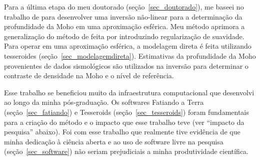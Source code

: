 \documentclass[10pt,a4paper,oneside]{book}
\begin{document}
Para a última etapa do meu doutorado (seção~\ref{sec_doutorado}), me baseei no
trabalho de \citet{Silva2014} para desenvolver uma inversão não-linear para
a determinação da profundidade da Moho em uma aproximação esférica.
Meu método aprimora a generalização do método de \citet{Bott1960} feita por
\citet{Silva2014} introduzindo regularização de suavidade.
Para operar em uma aproximação esférica, a modelagem direta é feita utilizando
tesseroides (seção~\ref{sec_modelagemdireta}).
Estimativas da profundidade da Moho provenientes de dados sismológicos são
utilizados na inversão para determinar o contraste de densidade na Moho e o
nível de referência.

Esse trabalho se beneficiou muito da infraestrutura computacional que
desenvolvi ao longo da minha pós-graduação.
Os softwares Fatiando a Terra (seção~\ref{sec_fatiando}) e Tesseroids
(seção~\ref{sec_tesseroids}) foram fundamentais para a criação do método e
o impacto que esse trabalho teve (ver ``impacto da pesquisa'' abaixo).
Foi com esse trabalho que realmente tive evidência de que minha dedicação à
ciência aberta e ao uso de software livre na pesquisa
(seção~\ref{sec_software}) não seriam prejudiciais a minha produtividade
científica.
\end{document}

